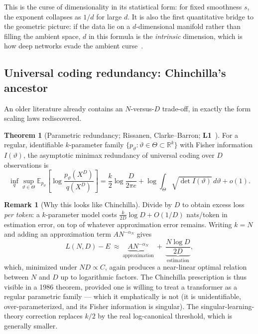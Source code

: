 \documentclass[11pt,a4paper]{article}
\theoremstyle{definition}
\newtheorem{theorem}{Theorem}[section]
\newtheorem{remark}{Remark}[section]
\begin{document}
This is the curse of dimensionality in its statistical form: for fixed smoothness $s$, the exponent collapses as $1/d$ for large $d$. It is also the first quantitative bridge to the geometric picture: if the data lie on a $d$-dimensional manifold rather than filling the ambient space, $d$ in this formula is the \emph{intrinsic} dimension, which is how deep networks evade the ambient curse~\cite{nakada2020adaptive,schmidt2020nonparametric}.

\subsection{Universal coding redundancy: Chinchilla's ancestor}
\label{subsec:mdl}

An older literature already contains an $N$-versus-$D$ trade-off, in exactly the form scaling laws rediscovered.

\begin{theorem}[Parametric redundancy; Rissanen, Clarke--Barron; \textbf{L1}~\cite{rissanen1986stochastic,rissanen1996fisher,clarke1990information}]
For a regular, identifiable $k$-parameter family $\{p_\vartheta:\vartheta\in\Theta\subset\mathbb{R}^k\}$ with Fisher information $I(\vartheta)$, the asymptotic minimax redundancy of universal coding over $D$ observations is
\begin{equation}
  \boxed{\inf_q \sup_{\vartheta\in\Theta} \mathbb{E}_{p_\vartheta}\!\left[\log\frac{p_\vartheta(X^D)}{q(X^D)}\right]
  = \frac{k}{2}\log\frac{D}{2\pi e} + \log\int_\Theta \sqrt{\det I(\vartheta)}\,d\vartheta + o(1)}.
\end{equation}
\end{theorem}

\begin{remark}[Why this looks like Chinchilla]
Divide by $D$ to obtain excess loss \emph{per token}: a $k$-parameter model costs $\frac{k}{2D}\log D + O(1/D)$ nats/token in estimation error, on top of whatever approximation error remains. Writing $k=N$ and adding an approximation term $A N^{-\alpha_N}$ gives
\begin{equation}
  L(N,D) - E \ \approx\ \underbrace{A N^{-\alpha_N}}_{\text{approximation}} \ +\ \underbrace{\frac{N\log D}{2D}}_{\text{estimation}} ,
  \label{eq:mdl-tradeoff}
\end{equation}
which, minimized under $ND \propto C$, again produces a near-linear optimal relation between $N$ and $D$ up to logarithmic factors. The Chinchilla prescription is thus visible in a 1986 theorem, provided one is willing to treat a transformer as a regular parametric family --- which it emphatically is not (it is unidentifiable, over-parameterized, and its Fisher information is singular). The singular-learning-theory correction replaces $k/2$ by the real log-canonical threshold, which is generally smaller.
\end{remark}
\end{document}
